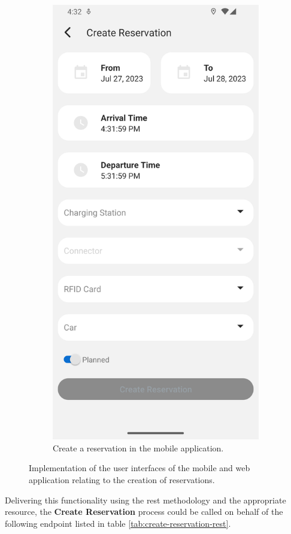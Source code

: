 \begin{figure}[h]
\begin{subfigure}[c]{0.3\textwidth}
        \includegraphics[width=\textwidth,height=1.6\textwidth,keepaspectratio]{resources/images/main/6_implementation/screens/create_reservation/mobile/Create_Reservation.png}
        \caption{Create a reservation in the mobile application.}
        \label{fig:mobile-create-reservation-impl}
    \end{subfigure}
    \caption{Implementation of the user interfaces of the mobile and web application relating to the creation of reservations.}
    \label{fig:impl-create-reservation}
\end{figure}

\noindent Delivering this functionality using the \acrshort{rest} methodology and the appropriate resource, the \textbf{Create Reservation} process could be called on behalf of the following endpoint listed in table \ref{tab:create-reservation-rest}.

